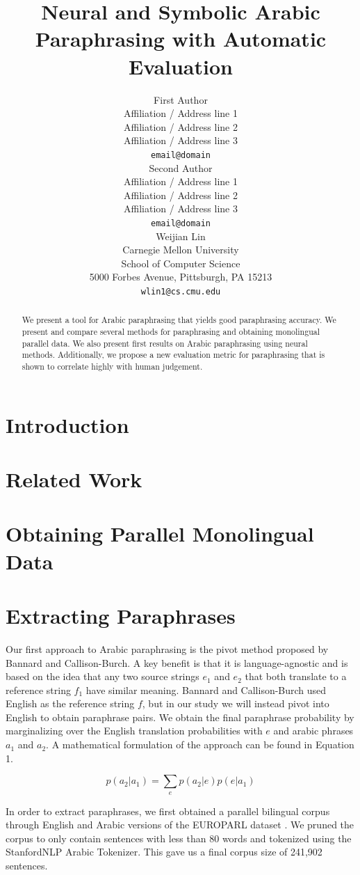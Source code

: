 \documentclass[11pt,letterpaper]{article}
\title{Neural and Symbolic Arabic Paraphrasing with Automatic Evaluation}
\author{First Author \\
  Affiliation / Address line 1 \\
  Affiliation / Address line 2 \\
  Affiliation / Address line 3 \\
  {\tt email@domain} \\\And
  Second Author \\
  Affiliation / Address line 1 \\
  Affiliation / Address line 2 \\
  Affiliation / Address line 3 \\
  {\tt email@domain} \\\And
  Weijian Lin \\
 Carnegie Mellon University\\
 School of Computer Science \\ 
 5000 Forbes Avenue, Pittsburgh, PA 15213 \\
  {\tt wlin1@cs.cmu.edu} \\}
\date{}
\begin{document}
\maketitle
\begin{abstract}

	We present a tool for Arabic paraphrasing that yields good paraphrasing accuracy.  We present and compare several methods for paraphrasing and obtaining monolingual parallel data. We also present first results on Arabic paraphrasing using neural methods. Additionally, we propose a new evaluation metric for paraphrasing that is shown to correlate highly with human judgement.
\end{abstract}


\section{Introduction}

\section{Related Work}

\section{Obtaining Parallel Monolingual Data}

\section{Extracting Paraphrases}
Our first approach to Arabic paraphrasing is the pivot method proposed by Bannard and Callison-Burch\cite{bannard2005bilingual}. A key benefit is that it is language-agnostic and is based on the idea that any two source strings $e_1$ and $e_2$ that both translate to a reference string $f_1$ have similar meaning. Bannard and Callison-Burch used English as the reference string $f$, but in our study we will instead pivot into English to obtain paraphrase pairs. We obtain the final paraphrase probability by marginalizing over the English translation probabilities with $e$ and arabic phrases $a_1$ and $a_2$. A mathematical formulation of the approach can be found in Equation 1.

\begin{equation}
p(a_2 | a_1) = \sum_{e} p(a_2 | e) p(e | a_1)
\end{equation}

In order to extract paraphrases, we first obtained a parallel bilingual corpus through English and Arabic versions of the EUROPARL dataset \cite{Koehn_europarl}. We pruned the corpus to only contain sentences with less than 80 words and tokenized using the StanfordNLP Arabic Tokenizer. This gave us a final corpus size of 241,902 sentences. 
\end{document}
